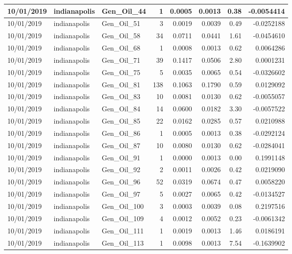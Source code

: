 \documentclass[
  letterpaper,
  DIV=11,
  numbers=noendperiod]{scrartcl}
\begin{document}
\begin{tabular}{l|l|l|r|r|r|r|r}
\hline
10/01/2019 & indianapolis & Gen\_Oil\_44 & 1 & 0.0005 & 0.0013 & 0.38 & -0.0054414\\
\hline
10/01/2019 & indianapolis & Gen\_Oil\_51 & 3 & 0.0019 & 0.0039 & 0.49 & -0.0252188\\
\hline
10/01/2019 & indianapolis & Gen\_Oil\_58 & 34 & 0.0711 & 0.0441 & 1.61 & -0.0454610\\
\hline
10/01/2019 & indianapolis & Gen\_Oil\_68 & 1 & 0.0008 & 0.0013 & 0.62 & 0.0064286\\
\hline
10/01/2019 & indianapolis & Gen\_Oil\_71 & 39 & 0.1417 & 0.0506 & 2.80 & 0.0001231\\
\hline
10/01/2019 & indianapolis & Gen\_Oil\_75 & 5 & 0.0035 & 0.0065 & 0.54 & -0.0326602\\
\hline
10/01/2019 & indianapolis & Gen\_Oil\_81 & 138 & 0.1063 & 0.1790 & 0.59 & 0.0129092\\
\hline
10/01/2019 & indianapolis & Gen\_Oil\_83 & 10 & 0.0081 & 0.0130 & 0.62 & -0.0055057\\
\hline
10/01/2019 & indianapolis & Gen\_Oil\_84 & 14 & 0.0600 & 0.0182 & 3.30 & -0.0057522\\
\hline
10/01/2019 & indianapolis & Gen\_Oil\_85 & 22 & 0.0162 & 0.0285 & 0.57 & 0.0210988\\
\hline
10/01/2019 & indianapolis & Gen\_Oil\_86 & 1 & 0.0005 & 0.0013 & 0.38 & -0.0292124\\
\hline
10/01/2019 & indianapolis & Gen\_Oil\_87 & 10 & 0.0080 & 0.0130 & 0.62 & -0.0284041\\
\hline
10/01/2019 & indianapolis & Gen\_Oil\_91 & 1 & 0.0000 & 0.0013 & 0.00 & 0.1991148\\
\hline
10/01/2019 & indianapolis & Gen\_Oil\_92 & 2 & 0.0011 & 0.0026 & 0.42 & 0.0219090\\
\hline
10/01/2019 & indianapolis & Gen\_Oil\_96 & 52 & 0.0319 & 0.0674 & 0.47 & 0.0058220\\
\hline
10/01/2019 & indianapolis & Gen\_Oil\_97 & 5 & 0.0027 & 0.0065 & 0.42 & -0.0134527\\
\hline
10/01/2019 & indianapolis & Gen\_Oil\_100 & 3 & 0.0003 & 0.0039 & 0.08 & 0.2197516\\
\hline
10/01/2019 & indianapolis & Gen\_Oil\_109 & 4 & 0.0012 & 0.0052 & 0.23 & -0.0061342\\
\hline
10/01/2019 & indianapolis & Gen\_Oil\_111 & 1 & 0.0019 & 0.0013 & 1.46 & 0.0186191\\
\hline
10/01/2019 & indianapolis & Gen\_Oil\_113 & 1 & 0.0098 & 0.0013 & 7.54 & -0.1639902\\

\end{tabular}
\end{document}

